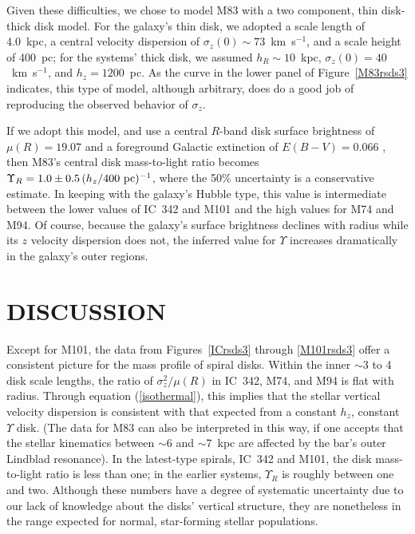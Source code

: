 \documentclass[12pt,preprint]{emulateapj}
\newcommand{\kms}{km~s$^{-1}$}
\begin{document}
Given these difficulties, we chose to model M83 with a two component, thin disk-thick disk model.  For the galaxy's thin disk, we adopted a scale length of 4.0~kpc, a central velocity dispersion of $\sigma_z(0) \sim 73$~\kms, and a scale height of 400~pc; for the systems' thick disk, we assumed $h_R \sim 10$~kpc, $\sigma_z(0) = 40$~\kms, and $h_z = 1200$~pc. As the curve in the lower panel of Figure~\ref{M83rsds3} indicates, this type of model, although arbitrary, does do a good job of reproducing the observed behavior of $\sigma_z$.

If we adopt this model, and use a central $R$-band disk surface brightness of $\mu(R) = 19.07$ \citep{k+00} and a foreground Galactic extinction of $E(B-V) = 0.066$ \citep{sfd98}, then M83's central disk mass-to-light ratio becomes $\Upsilon_R = 1.0 \pm 0.5 \, (h_z / 400~{\rm pc})^{-1}$, where the 50\% uncertainty is a conservative estimate.   In keeping with the galaxy's Hubble type, this value is intermediate between the lower values of IC~342 and M101 and the high values for M74 and M94.  Of course, because the galaxy's surface brightness declines with radius while its $z$ velocity dispersion does not, the inferred value for $\Upsilon$ increases dramatically in the galaxy's outer regions.

\section{DISCUSSION}

Except for M101, the data from Figures~\ref{ICrsds3} through \ref{M101rsds3} offer a consistent picture for the mass profile of spiral disks.  Within the inner $\sim$3 to 4 disk scale lengths, the ratio of $\sigma_z^2 / \mu(R)$ in IC~342, M74, and M94 is flat with radius.  Through equation (\ref{isothermal}), this implies that the stellar vertical velocity dispersion is consistent with that expected from a constant $h_z$, constant $\Upsilon$ disk.  (The data for M83 can also be interpreted in this way, if one accepts that the stellar kinematics between $\sim$6 and $\sim$7~kpc are affected by the bar's outer Lindblad resonance).  In the latest-type spirals, IC~342 and M101, the disk mass-to-light ratio is less than one; in the earlier systems, $\Upsilon_R$ is roughly between one and two.   Although these numbers have a degree of systematic uncertainty due to our lack of knowledge about the disks' vertical structure, they are nonetheless in the range expected for normal, star-forming stellar populations.
\end{document}
